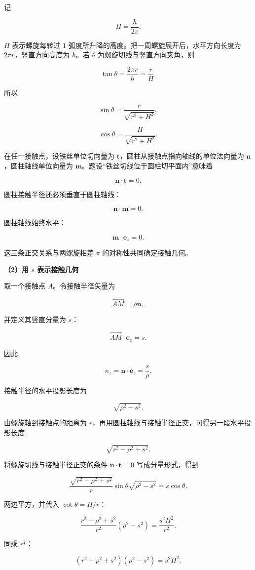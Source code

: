 \documentclass[12pt,a4paper,UTF8]{ctexart}
\begin{document}
记

\[H=\frac{h}{2\pi}.\]

\(H\) 表示螺旋每转过 \(1\)
弧度所升降的高度。把一周螺旋展开后，水平方向长度为
\(2\pi r\)，竖直方向高度为 \(h\)。若 \(\theta\)
为螺旋切线与竖直方向夹角，则

\[\tan\theta=\frac{2\pi r}{h}=\frac rH.\]

所以

\[\sin\theta=\frac r{\sqrt{r^2+H^2}},\]

\[\cos\theta=\frac H{\sqrt{r^2+H^2}}.\]

在任一接触点，设铁丝单位切向量为
\(\bm t\)，圆柱从接触点指向轴线的单位法向量为
\(\bm n\)，圆柱轴线单位向量为
\(\bm m\)。题设``铁丝切线位于圆柱切平面内''意味着

\[\bm n\cdot\bm t=0.\]

圆柱接触半径还必须垂直于圆柱轴线：

\[\bm n\cdot\bm m=0.\]

圆柱轴线始终水平：

\[\bm m\cdot\bm e_z=0.\]

这三条正交关系与两螺旋相差 \(\pi\) 的对称性共同确定接触几何。

\textbf{（2）用 \(s\) 表示接触几何}

取一个接触点 \(A\)。令接触半径矢量为

\[\overrightarrow{AM}=\rho\bm n,\]

并定义其竖直分量为 \(s\)：

\[\overrightarrow{AM}\cdot\bm e_z=s.\]

因此

\[n_z=\bm n\cdot\bm e_z=\frac{s}{\rho}.\]

接触半径的水平投影长度为

\[\sqrt{\rho^2-s^2}.\]

由螺旋轴到接触点的距离为
\(r\)，再用圆柱轴线与接触半径正交，可得另一段水平投影长度

\[\sqrt{r^2-\rho^2+s^2}.\]

将螺旋切线与接触半径正交的条件 \(\bm n\cdot\bm t=0\) 写成分量形式，得到

\[\frac{\sqrt{r^2-\rho^2+s^2}}{r}
\sin\theta\sqrt{\rho^2-s^2}
=s\cos\theta.\]

两边平方，并代入 \(\cot\theta=H/r\)：

\[\frac{r^2-\rho^2+s^2}{r^2}(\rho^2-s^2)
=\frac{s^2H^2}{r^2}.\]

同乘 \(r^2\)：

\[\boxed{
(r^2-\rho^2+s^2)(\rho^2-s^2)=s^2H^2
}.\]
\end{document}
